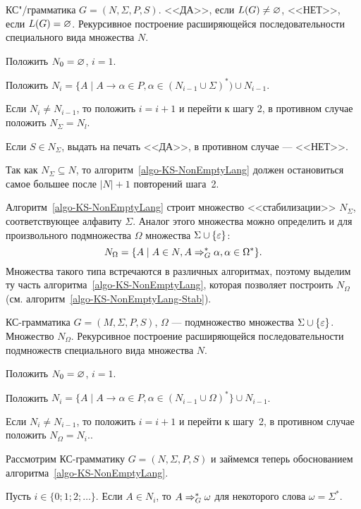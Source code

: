 {\label{algo-KS-NonEmptyLang} КС"/грамматика $G=(N,\Sigma,P,S)$.}
{<<ДА>>, если $L(G)\neq\varnothing$, <<НЕТ>>, если $L(G)=\varnothing$.}
{Рекурсивное построение расширяющейся последовательности специального вида множества $N$.}
{
\item Положить $N_0=\varnothing$, $i=1$.

\item Положить $N_i=\{A\mid A\to\alpha\in P, \alpha\in(N_{i-1}\cup\Sigma)^*)\cup N_{i-1}$.

\item Если $N_i\neq N_{i-1}$, то положить $i=i+1$ и перейти к шагу 2, в противном случае положить $N_\Sigma = N_l$.

\item Если $S\in N_\Sigma$, выдать на печать <<ДА>>, в противном случае --- <<НЕТ>>.
}

Так как $N_\Sigma\subseteq N$, то алгоритм~\ref{algo-KS-NonEmptyLang} должен остановиться самое большее после $|N|+1$ повторений шага~2.

Алгоритм~\ref{algo-KS-NonEmptyLang} строит множество <<стабилизации>> $N_\Sigma$, соответствующее алфавиту $\Sigma$. Аналог этого множества можно определить и для произвольного подмножества $\Omega$ множества $\Sigma\cup\{\varepsilon\}$:
\[
    N_\Omega=\{A\mid A\in N, A\Rightarrow_G^*\alpha, \alpha\in\Omega^*\}.
\]
Множества такого типа встречаются в различных алгоритмах, поэтому выделим ту часть алгоритма~\ref{algo-KS-NonEmptyLang}, которая позволяет построить $N_\Omega$ (см. алгоритм~\ref{algo-KS-NonEmptyLang-Stab}).

{\label{algo-KS-NonEmptyLang-Stab}КС-грамматика $G=(M,\Sigma,P,S)$, $\Omega$ --- подмножество множества $\Sigma\cup\{\varepsilon\}$.}
{Множество $N_\Omega$.}
{Рекурсивное построение расширяющейся последовательности подмножеств специального вида множества $N$.}
{
\item Положить $N_0=\varnothing$, $i=1$.

\item Положить $N_i=\{A\mid A\to\alpha\in P, \alpha\in(N_{i-1}\cup \Omega)^*\}\cup N_{i-1}$.

\item Если $N_i\neq N_{i-1}$, то положить $i=i+1$ и перейти к
шагу~2, в противном случае положить $N_\Omega=N_i.$.
}

Рассмотрим КС-грамматику $G=(N,\Sigma,P,S)$ и займемся теперь обоснованием алгоритма~\ref{algo-KS-NonEmptyLang}.

\begin{mylemma}
\label{lemma-NonEmptyAlgoCorr-1}
Пусть $i\in\{0;1;2;\ldots \}$. Если $A\in N_i$, то $A\Rightarrow_G^*\omega$ для некоторого слова $\omega=\Sigma^*$.
\end{mylemma}

